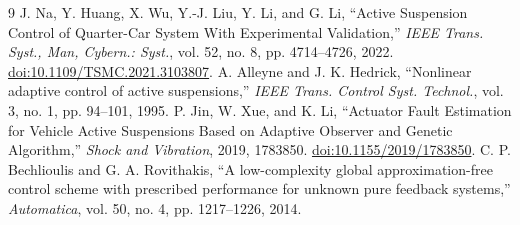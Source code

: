 \documentclass[10pt,a4paper]{article}
\begin{document}
\begin{thebibliography}{9}
 J. Na, Y. Huang, X. Wu, Y.-J. Liu, Y. Li, and G. Li, ``Active Suspension Control of Quarter-Car System With Experimental Validation,'' \emph{IEEE Trans. Syst., Man, Cybern.: Syst.}, vol. 52, no. 8, pp. 4714--4726, 2022. \href{https://doi.org/10.1109/TSMC.2021.3103807}{doi:10.1109/TSMC.2021.3103807}.
 A. Alleyne and J. K. Hedrick, ``Nonlinear adaptive control of active suspensions,'' \emph{IEEE Trans. Control Syst. Technol.}, vol. 3, no. 1, pp. 94--101, 1995.
 P. Jin, W. Xue, and K. Li, ``Actuator Fault Estimation for Vehicle Active Suspensions Based on Adaptive Observer and Genetic Algorithm,'' \emph{Shock and Vibration}, 2019, 1783850. \href{https://doi.org/10.1155/2019/1783850}{doi:10.1155/2019/1783850}.
 C. P. Bechlioulis and G. A. Rovithakis, ``A low-complexity global approximation-free control scheme with prescribed performance for unknown pure feedback systems,'' \emph{Automatica}, vol. 50, no. 4, pp. 1217--1226, 2014.
\end{thebibliography}
\end{document}
